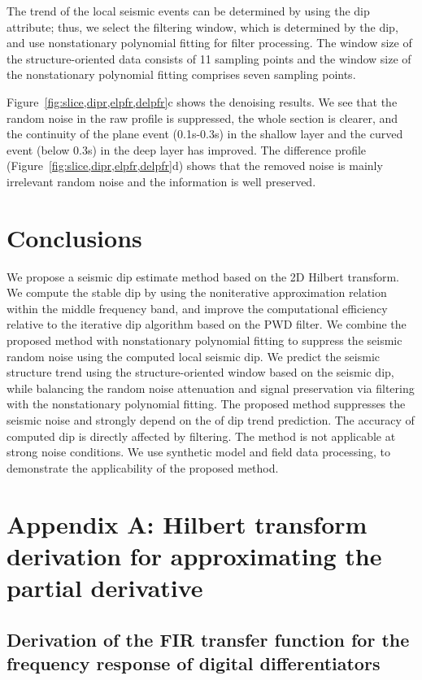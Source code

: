 The trend of the local seismic events
can be determined by using the dip attribute; thus, we select the
filtering window, which is determined by the dip, and use
nonstationary polynomial fitting for filter processing. The window
size of the structure-oriented data consists of 11 sampling points and
the window size of the nonstationary polynomial fitting comprises
seven sampling points. 

Figure~\ref{fig:slice,dipr,elpfr,delpfr}c
shows the denoising results. We see that the random noise in the raw
profile is suppressed, the whole section is clearer, and the
continuity of the plane event (0.1s-0.3s) in the shallow layer and the
curved event (below 0.3s) in the deep layer has improved.  The
difference profile (Figure~\ref{fig:slice,dipr,elpfr,delpfr}d) shows
that the removed noise is mainly irrelevant random noise and the
information is well preserved.

\section{Conclusions}

We propose a seismic dip estimate method based on the 2D Hilbert
transform. We compute the stable dip by using the noniterative
approximation relation within the middle frequency band, and improve
the computational efficiency relative to the iterative dip algorithm
based on the PWD filter. We combine the proposed method with
nonstationary polynomial fitting to suppress the seismic random noise
using the computed local seismic dip. We predict the seismic structure
trend using the structure-oriented window based on the seismic dip,
while balancing the random noise attenuation and signal preservation
via filtering with the nonstationary polynomial fitting. The proposed
method suppresses the seismic noise and strongly depend on the of dip
trend prediction. The accuracy of computed dip is directly affected by
filtering. The method is not applicable at strong noise conditions. We
use synthetic model and field data processing, to demonstrate the
applicability of the proposed method.

\appendix
\section{Appendix A: Hilbert transform derivation for approximating the partial derivative}
\subsection{Derivation of the FIR transfer function for the frequency response of digital differentiators}

